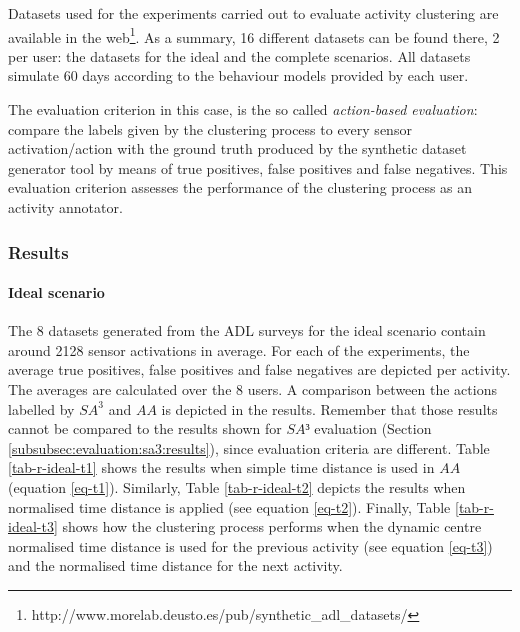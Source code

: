 Datasets used for the experiments carried out to evaluate activity clustering are available in the web\footnote{http://www.morelab.deusto.es/pub/synthetic\_adl\_datasets/}. As a summary, 16 different datasets can be found there, 2 per user: the datasets for the ideal and the complete scenarios. All datasets simulate 60 days according to the behaviour models provided by each user.

The evaluation criterion in this case, is the so called \textit{action-based evaluation}: compare the labels given by the clustering process to every sensor activation/action with the ground truth produced by the synthetic dataset generator tool by means of true positives, false positives and false negatives. This evaluation criterion assesses the performance of the clustering process as an activity annotator.

\subsubsection{Results}
\label{subsubsec:evaluation:clustering:results}

\paragraph*{Ideal scenario}

The 8 datasets generated from the ADL surveys for the ideal scenario contain around 2128 sensor activations in average. For each of the experiments, the average true positives, false positives and false negatives are depicted per activity. The averages are calculated over the 8 users. A comparison between the actions labelled by $SA^3$ and $AA$ is depicted in the results. Remember that those results cannot be compared to the results shown for $SA³$ evaluation (Section \ref{subsubsec:evaluation:sa3:results}), since evaluation criteria are different. Table \ref{tab-r-ideal-t1} shows the results when simple time distance is used in $AA$ (equation \ref{eq-t1}). Similarly, Table \ref{tab-r-ideal-t2} depicts the results when normalised time distance is applied (see equation \ref{eq-t2}). Finally, Table \ref{tab-r-ideal-t3} shows how the clustering process performs when the dynamic centre normalised time distance is used for the previous activity (see equation \ref{eq-t3}) and the normalised time distance for the next activity.

